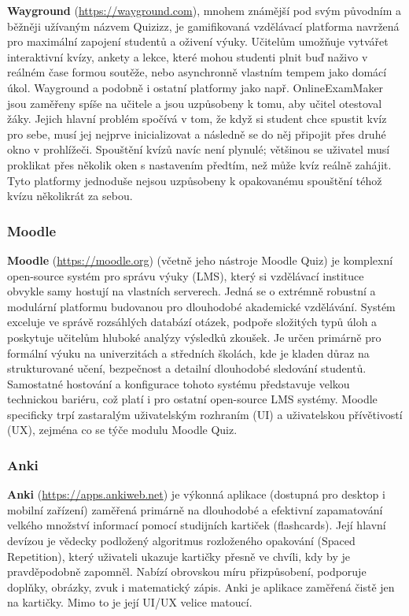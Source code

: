 \documentclass{vskpou} %
\begin{document}
\textbf{Wayground} (\url{https://wayground.com}), mnohem známější pod svým původním a běžněji užívaným názvem Quizizz, je gamifikovaná vzdělávací platforma navržená pro maximální zapojení studentů a oživení výuky. Učitelům umožňuje vytvářet interaktivní kvízy, ankety a lekce, které mohou studenti plnit buď naživo v reálném čase formou soutěže, nebo asynchronně vlastním tempem jako domácí úkol. Wayground a podobně i ostatní platformy jako např. OnlineExamMaker jsou zaměřeny spíše na učitele a jsou uzpůsobeny k tomu, aby učitel otestoval žáky. Jejich hlavní problém spočívá v tom, že když si student chce spustit kvíz pro sebe, musí jej nejprve inicializovat a následně se do něj připojit přes druhé okno v prohlížeči. Spouštění kvízů navíc není plynulé; většinou se uživatel musí proklikat přes několik oken s nastavením předtím, než může kvíz reálně zahájit. Tyto platformy jednoduše nejsou uzpůsobeny k opakovanému spouštění téhož kvízu několikrát za sebou.

\subsubsection{Moodle}

\textbf{Moodle} (\url{https://moodle.org}) (včetně jeho nástroje Moodle Quiz) je komplexní open-source systém pro správu výuky (LMS), který si vzdělávací instituce obvykle samy hostují na vlastních serverech. Jedná se o extrémně robustní a modulární platformu budovanou pro dlouhodobé akademické vzdělávání. Systém exceluje ve správě rozsáhlých databází otázek, podpoře složitých typů úloh a poskytuje učitelům hluboké analýzy výsledků zkoušek. Je určen primárně pro formální výuku na univerzitách a středních školách, kde je kladen důraz na strukturované učení, bezpečnost a detailní dlouhodobé sledování studentů. Samostatné hostování a konfigurace tohoto systému představuje velkou technickou bariéru, což platí i pro ostatní open-source LMS systémy. Moodle specificky trpí zastaralým uživatelským rozhraním (UI) a uživatelskou přívětivostí (UX), zejména co se týče modulu Moodle Quiz.

\subsubsection{Anki}

\textbf{Anki} (\url{https://apps.ankiweb.net}) je výkonná aplikace (dostupná pro desktop i mobilní zařízení) zaměřená primárně na dlouhodobé a efektivní zapamatování velkého množství informací pomocí studijních kartiček (flashcards). Její hlavní devízou je vědecky podložený algoritmus rozloženého opakování (Spaced Repetition), který uživateli ukazuje kartičky přesně ve chvíli, kdy by je pravděpodobně zapomněl. Nabízí obrovskou míru přizpůsobení, podporuje doplňky, obrázky, zvuk i matematický zápis. Anki je aplikace zaměřená čistě jen na kartičky. Mimo to je její UI/UX velice matoucí.
\end{document}
